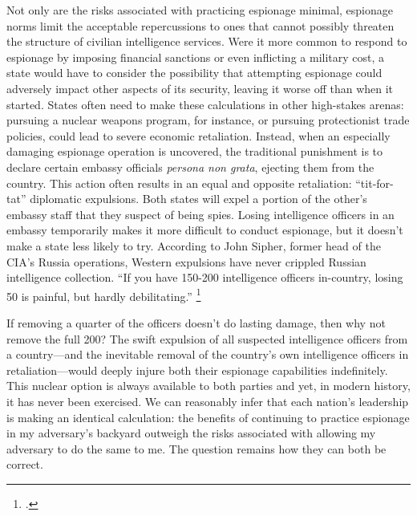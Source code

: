 \documentclass[14pt]{extarticle}
\begin{document}

Not only are the risks associated with practicing espionage minimal, espionage norms limit the acceptable repercussions to ones that cannot possibly threaten the structure of civilian intelligence services. Were it more common to respond to espionage by imposing financial sanctions or even inflicting a military cost, a state would have to consider the possibility that attempting espionage could adversely impact other aspects of its security, leaving it worse off than when it started. States often need to make these calculations in other high-stakes arenas: pursuing a nuclear weapons program, for instance, or pursuing protectionist trade policies, could lead to severe economic retaliation. Instead, when an especially damaging espionage operation is uncovered, the traditional punishment is to declare certain embassy officials \emph{persona non grata}, ejecting them from the country. This action often results in an equal and opposite retaliation: \enquote{tit-for-tat} diplomatic expulsions. Both states will expel a portion of the other's embassy staff that they suspect of being spies. Losing intelligence officers in an embassy temporarily makes it more difficult to conduct espionage, but it doesn't make a state less likely to try. According to John Sipher, former head of the CIA's Russia operations, Western expulsions have never crippled Russian intelligence collection. \enquote{If you have 150-200 intelligence officers in-country, losing 50 is painful, but hardly debilitating.} \footcite{dettmer_united_2018}

If removing a quarter of the officers doesn't do lasting damage, then why not remove the full 200? The swift expulsion of all suspected intelligence officers from a country---and the inevitable removal of the country's own intelligence officers in retaliation---would deeply injure both their espionage capabilities indefinitely. This nuclear option is always available to both parties and yet, in modern history, it has never been exercised. We can reasonably infer that each nation's leadership is making an identical calculation: the benefits of continuing to practice espionage in my adversary's backyard outweigh the risks associated with allowing my adversary to do the same to me. The question remains how they can both be correct.
\end{document}
